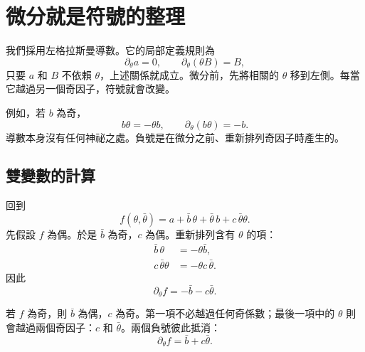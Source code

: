 \section{微分就是符號的整理}

我們採用左格拉斯曼導數。它的局部定義規則為
\begin{equation}
\partial_\theta a=0,
\qquad
\partial_\theta(\theta B)=B,
\end{equation}
只要 \(a\) 和 \(B\) 不依賴 \(\theta\)，上述關係就成立。微分前，先將相關的 \(\theta\) 移到左側。每當它越過另一個奇因子，符號就會改變。

例如，若 \(b\) 為奇，
\begin{equation}
b\theta=-\theta b,
\qquad
\partial_\theta(b\theta)=-b.
\end{equation}
導數本身沒有任何神祕之處。負號是在微分之前、重新排列奇因子時產生的。

\subsection{雙變數的計算}

回到
\begin{equation}
f(\theta,\bar\theta)
=a+\bar b\,\theta+\bar\theta\,b+c\,\bar\theta\theta.
\end{equation}
先假設 \(f\) 為偶。於是 \(\bar b\) 為奇，\(c\) 為偶。重新排列含有 \(\theta\) 的項：
\begin{align}
\bar b\,\theta&=-\theta\bar b,\\
c\,\bar\theta\theta&=-\theta c\,\bar\theta.
\end{align}
因此
\begin{equation}
\partial_\theta f=-\bar b-c\bar\theta.
\end{equation}

若 \(f\) 為奇，則 \(\bar b\) 為偶，\(c\) 為奇。第一項不必越過任何奇係數；最後一項中的 \(\theta\) 則會越過兩個奇因子：\(c\) 和 \(\bar\theta\)。兩個負號彼此抵消：
\begin{equation}
\partial_\theta f=\bar b+c\bar\theta.
\end{equation}

\begin{classroomqa}
\end{classroomqa}

